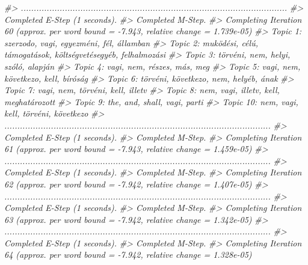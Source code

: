 \documentclass[
]{book}
\newenvironment{Shaded}{\begin{snugshade}}{\end{snugshade}}
\newcommand{\CommentTok}[1]{\textcolor[rgb]{0.56,0.35,0.01}{\textit{#1}}}
\begin{document}
\begin{Shaded}
\begin{Highlighting}[]
\CommentTok{\#\textgreater{} .......................................................................................................}
\CommentTok{\#\textgreater{} Completed E{-}Step (1 seconds). }
\CommentTok{\#\textgreater{} Completed M{-}Step. }
\CommentTok{\#\textgreater{} Completing Iteration 60 (approx. per word bound = {-}7.943, relative change = 1.739e{-}05) }
\CommentTok{\#\textgreater{} Topic 1: szerzodo, vagi, egyezméni, fél, államban }
\CommentTok{\#\textgreater{}  Topic 2: muködési, célú, támogatások, költségvetésegyéb, felhalmozási }
\CommentTok{\#\textgreater{}  Topic 3: törvéni, nem, helyi, szóló, alapján }
\CommentTok{\#\textgreater{}  Topic 4: vagi, nem, részes, más, meg }
\CommentTok{\#\textgreater{}  Topic 5: vagi, nem, következo, kell, bíróság }
\CommentTok{\#\textgreater{}  Topic 6: törvéni, következo, nem, helyéb, ának }
\CommentTok{\#\textgreater{}  Topic 7: vagi, nem, törvéni, kell, illetv }
\CommentTok{\#\textgreater{}  Topic 8: nem, vagi, illetv, kell, meghatározott }
\CommentTok{\#\textgreater{}  Topic 9: the, and, shall, vagi, parti }
\CommentTok{\#\textgreater{}  Topic 10: nem, vagi, kell, törvéni, következo }
\CommentTok{\#\textgreater{} .......................................................................................................}
\CommentTok{\#\textgreater{} Completed E{-}Step (1 seconds). }
\CommentTok{\#\textgreater{} Completed M{-}Step. }
\CommentTok{\#\textgreater{} Completing Iteration 61 (approx. per word bound = {-}7.943, relative change = 1.459e{-}05) }
\CommentTok{\#\textgreater{} .......................................................................................................}
\CommentTok{\#\textgreater{} Completed E{-}Step (1 seconds). }
\CommentTok{\#\textgreater{} Completed M{-}Step. }
\CommentTok{\#\textgreater{} Completing Iteration 62 (approx. per word bound = {-}7.942, relative change = 1.407e{-}05) }
\CommentTok{\#\textgreater{} .......................................................................................................}
\CommentTok{\#\textgreater{} Completed E{-}Step (1 seconds). }
\CommentTok{\#\textgreater{} Completed M{-}Step. }
\CommentTok{\#\textgreater{} Completing Iteration 63 (approx. per word bound = {-}7.942, relative change = 1.342e{-}05) }
\CommentTok{\#\textgreater{} .......................................................................................................}
\CommentTok{\#\textgreater{} Completed E{-}Step (1 seconds). }
\CommentTok{\#\textgreater{} Completed M{-}Step. }
\CommentTok{\#\textgreater{} Completing Iteration 64 (approx. per word bound = {-}7.942, relative change = 1.328e{-}05) }

\end{Highlighting}
\end{Shaded}
\end{document}
